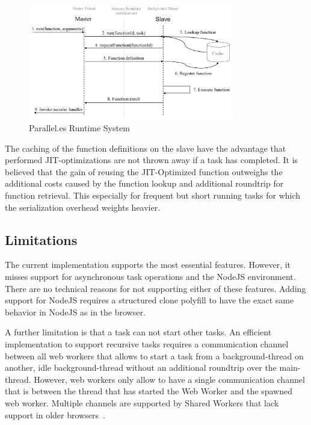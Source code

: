 \begin{figure}
	\centering
	\includegraphics[width=0.8\textwidth]{runtime-system.pdf}

	\caption{Parallel.es Runtime System}
	\label{fig:runtime-system}
\end{figure}

The caching of the function definitions on the slave have the advantage that performed JIT-optimizations are not thrown away if a task has completed. It is believed that the gain of reusing the JIT-Optimized function outweighs the additional costs caused by the function lookup and additional roundtrip for function retrieval. This especially for frequent but short running tasks for which the serialization overhead weights heavier. 


\subsection{Limitations}
The current implementation supports the most essential features. However, it misses support for asynchronous task operations and the NodeJS environment. There are no technical reasons for not supporting either of these features. Adding support for NodeJS requires a structured clone polyfill to have the exact same behavior in NodeJS as in the browser.

A further limitation is that a task can not start other tasks. An efficient implementation to support recursive tasks requires a communication channel between all web workers that allows to start a task from a background-thread on another, idle background-thread without an additional roundtrip over the main-thread. However, web workers only allow to have a single communication channel that is between the thread that has started the Web Worker and the spawned web worker. Multiple channels are supported by Shared Workers that lack support in older browsers~\cite[section 4.6.4]{w3cWebWorker}.